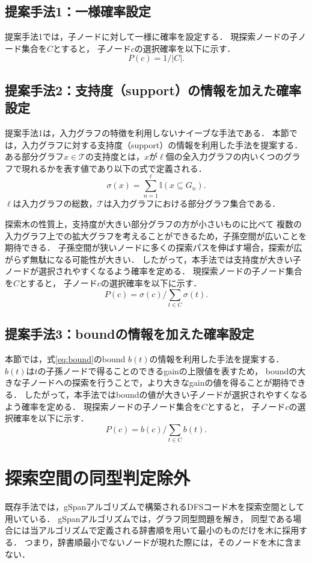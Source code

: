 \subsection{提案手法1：一様確率設定}
提案手法1では，子ノードに対して一様に確率を設定する．
現探索ノードの子ノード集合を$C$とすると，
子ノード$c$の選択確率を以下に示す．
\[
	P(c) = 1 / |C|.
\]

\subsection{提案手法2：支持度（support）の情報を加えた確率設定}
提案手法1は，入力グラフの特徴を利用しないナイーブな手法である．
本節では，入力グラフに対する支持度（support）の情報を利用した手法を提案する．
ある部分グラフ$x \in \mathcal{T}$の支持度とは，$x$が$\ell$個の全入力グラフの内いくつのグラフで現れるかを表す値であり以下の式で定義される．
\[
	\sigma(x) = \sum_{n=1}^{\ell} \mathbb{I} (x \subseteq G_n) .
\]
$\ell$は入力グラフの総数，$\mathcal{T}$は入力グラフにおける部分グラフ集合である．

探索木の性質上，支持度が大きい部分グラフの方が小さいものに比べて
複数の入力グラフ上での拡大グラフを考えることができるため，子孫空間が広いことを期待できる．
子孫空間が狭いノードに多くの探索パスを伸ばす場合，探索が広がらず無駄になる可能性が大きい．
したがって，本手法では支持度が大きい子ノードが選択されやすくなるよう確率を定める．
現探索ノードの子ノード集合を$C$とすると，
子ノード$c$の選択確率を以下に示す．
\[
	P(c) = \sigma(c) / \sum_{t \in C} \sigma(t).
\]

\subsection{提案手法3：boundの情報を加えた確率設定}
本節では，式\eqref{eq:bound}のbound $b(t)$の情報を利用した手法を提案する．
$b(t)$は$t$の子孫ノードで得ることのできるgainの上限値を表すため，
boundの大きな子ノードへの探索を行うことで，より大きなgainの値を得ることが期待できる．
したがって，本手法ではboundの値が大きい子ノードが選択されやすくなるよう確率を定める．
現探索ノードの子ノード集合を$C$とすると，
子ノード$c$の選択確率を以下に示す．
\[
	P(c)  =  b(c) / \sum_{t \in C} b(t).
\]

\section{探索空間の同型判定除外}
\label{search space}
既存手法では，gSpan\cite{gSpan}アルゴリズムで構築されるDFSコード木を探索空間として用いている．
gSpanアルゴリズムでは，グラフ同型問題を解き，
同型である場合には当アルゴリズムで定義される辞書順を用いて最小のものだけを木に採用する．
つまり，辞書順最小でないノードが現れた際には，そのノードを木に含まない．

